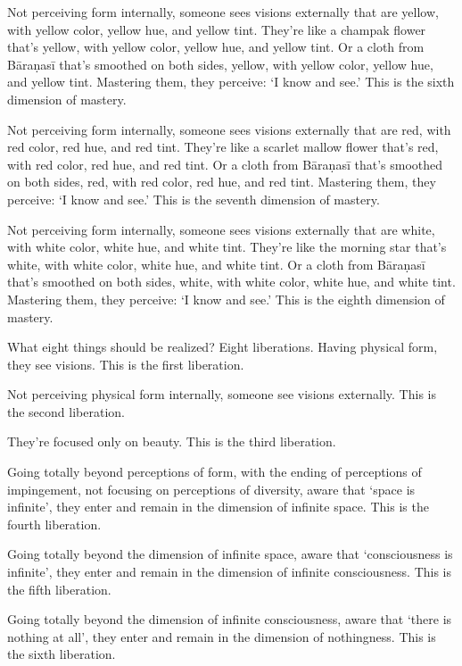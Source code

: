 \documentclass[12pt,openany]{book}%
\begin{document}
Not perceiving form internally, someone sees visions externally that are yellow, with yellow color, yellow hue, and yellow tint. They’re like a champak flower that’s yellow, with yellow color, yellow hue, and yellow tint. Or a cloth from \textsanskrit{Bāraṇasī} that’s smoothed on both sides, yellow, with yellow color, yellow hue, and yellow tint. Mastering them, they perceive: ‘I know and see.’ This is the sixth dimension of mastery. 

Not perceiving form internally, someone sees visions externally that are red, with red color, red hue, and red tint. They’re like a scarlet mallow flower that’s red, with red color, red hue, and red tint. Or a cloth from \textsanskrit{Bāraṇasī} that’s smoothed on both sides, red, with red color, red hue, and red tint. Mastering them, they perceive: ‘I know and see.’ This is the seventh dimension of mastery. 

Not perceiving form internally, someone sees visions externally that are white, with white color, white hue, and white tint. They’re like the morning star that’s white, with white color, white hue, and white tint. Or a cloth from \textsanskrit{Bāraṇasī} that’s smoothed on both sides, white, with white color, white hue, and white tint. Mastering them, they perceive: ‘I know and see.’ This is the eighth dimension of mastery. 

What eight things should be realized? Eight liberations. Having physical form, they see visions. This is the first liberation. 

Not perceiving physical form internally, someone see visions externally. This is the second liberation. 

They’re focused only on beauty. This is the third liberation. 

Going totally beyond perceptions of form, with the ending of perceptions of impingement, not focusing on perceptions of diversity, aware that ‘space is infinite’, they enter and remain in the dimension of infinite space. This is the fourth liberation. 

Going totally beyond the dimension of infinite space, aware that ‘consciousness is infinite’, they enter and remain in the dimension of infinite consciousness. This is the fifth liberation. 

Going totally beyond the dimension of infinite consciousness, aware that ‘there is nothing at all’, they enter and remain in the dimension of nothingness. This is the sixth liberation. 
\end{document}
